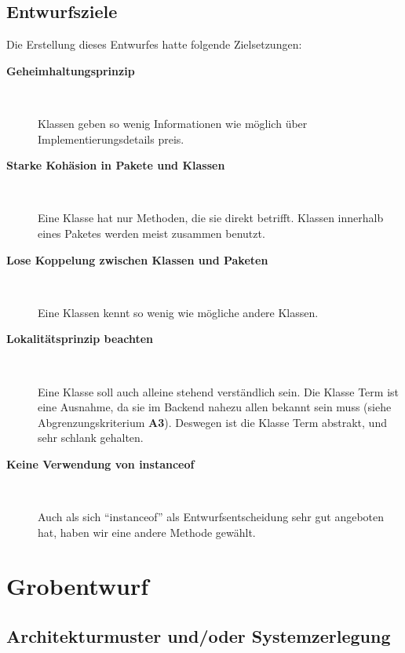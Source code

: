 \documentclass[parskip=full,11pt,twoside]{scrbook}
\begin{document}
\subsection{Entwurfsziele}
Die Erstellung dieses Entwurfes hatte folgende Zielsetzungen:
\begin{description}
	
		\item[\textbf{Geheimhaltungsprinzip}] ~\par
			Klassen geben so wenig Informationen wie möglich über Implementierungsdetails preis.
			
		\item[\textbf{Starke Kohäsion in Pakete und Klassen}] ~\par
			Eine Klasse hat nur Methoden, die sie direkt betrifft. 
            Klassen innerhalb eines Paketes werden meist zusammen benutzt.
			
		\item[\textbf{Lose Koppelung zwischen Klassen und Paketen}]~\par
			Eine Klassen kennt so wenig wie mögliche andere Klassen.
			
		\item[\textbf{Lokalitätsprinzip beachten}] ~\par
			Eine Klasse soll auch alleine stehend verständlich sein.
            Die Klasse Term ist eine Ausnahme, da sie im Backend nahezu allen bekannt sein muss (siehe Abgrenzungskriterium \textbf{A3}).
            Deswegen ist die Klasse Term abstrakt, und sehr schlank gehalten.
			
		\item[\textbf{Keine Verwendung von instanceof}] ~\par
            Auch als sich \enquote{instanceof} als Entwurfsentscheidung sehr gut angeboten hat, haben wir eine andere Methode gewählt.
	
\end{description}
\pagebreak

\section{Grobentwurf}
\subsection{Architekturmuster und/oder Systemzerlegung}
\end{document}
